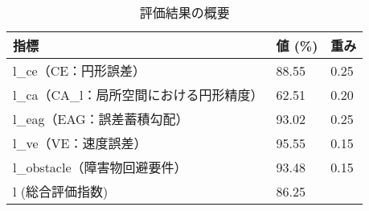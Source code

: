 
\begin{table}[ht]
	\caption{評価結果の概要}
	\centering
	\begin{tabular}{l|l|l}
		\hline
		指標                        & 値 (\%) & 重み   \\ \hline
		l\_ce（CE：円形誤差）            & 88.55  & 0.25 \\
		l\_ca（CA\_l：局所空間における円形精度） & 62.51  & 0.20 \\
		l\_eag（EAG：誤差蓄積勾配）        & 93.02  & 0.25 \\
		l\_ve（VE：速度誤差）            & 95.55  & 0.15 \\
		l\_obstacle（障害物回避要件）      & 93.48  & 0.15 \\
		l (総合評価指数)                & 86.25  &      \\ \hline
	\end{tabular}
	\label{table:evaluation_index}
\end{table}


